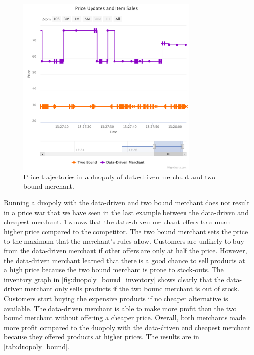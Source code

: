 \begin{figure}[t]
	\centering
	\includegraphics[width=0.8\textwidth]{figures/duopoly_bound_prices}
	\caption[Price trajectories: data-driven merchant versus two bound merchant]{Price trajectories in a duopoly of data-driven merchant and two bound merchant.}
	\label{fig:duopoly_bound_prices}
\end{figure}

Running a duopoly with the data-driven and two bound merchant does not result in a price war that we have seen in the last example between the data-driven and cheapest merchant.
\cref{fig:duopoly_bound_prices} shows that the data-driven merchant offers to a much higher price compared to the competitor.
The two bound merchant sets the price to the maximum that the merchant's rules allow.
Customers are unlikely to buy from the data-driven merchant if other offers are only at half the price.
However, the data-driven merchant learned that there is a good chance to sell products at a high price because the two bound merchant is prone to stock-outs.
The inventory graph in \cref{fig:duopoly_bound_inventory} shows clearly that the data-driven merchant only sells products if the two bound merchant is out of stock.
Customers start buying the expensive products if no cheaper alternative is available.
The data-driven merchant is able to make more profit than the two bound merchant without offering a cheaper price.
Overall, both merchants made more profit compared to the duopoly with the data-driven and cheapest merchant because they offered products at higher prices.
The results are in \cref{tab:duopoly_bound}.

